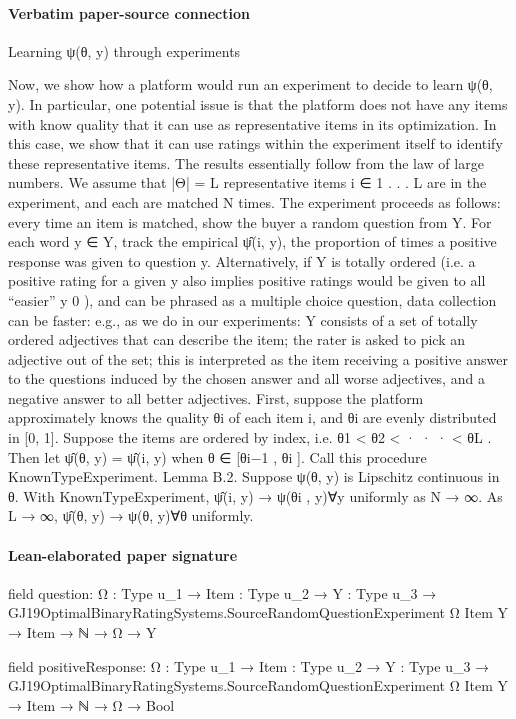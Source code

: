 \documentclass[10pt]{article}
\begin{document}
\paragraph{Verbatim paper-source connection}
\begin{ReviewVerbatim}
Learning ψ(θ, y) through experiments

Now, we show how a platform would run an experiment to decide to learn ψ(θ, y). In particular,
one potential issue is that the platform does not have any items with know quality that it can use
as representative items in its optimization. In this case, we show that it can use ratings within the
experiment itself to identify these representative items. The results essentially follow from the law
of large numbers.
We assume that |Θ| = L representative items i ∈ {1 . . . L} are in the experiment, and each are
matched N times. The experiment proceeds as follows: every time an item is matched, show the
buyer a random question from Y. For each word y ∈ Y, track the empirical ψ̂(i, y), the proportion
of times a positive response was given to question y. Alternatively, if Y is totally ordered (i.e. a
positive rating for a given y also implies positive ratings would be given to all “easier” y 0 ), and
can be phrased as a multiple choice question, data collection can be faster: e.g., as we do in our
experiments: Y consists of a set of totally ordered adjectives that can describe the item; the rater is
asked to pick an adjective out of the set; this is interpreted as the item receiving a positive answer
to the questions induced by the chosen answer and all worse adjectives, and a negative answer to
all better adjectives.
First, suppose the platform approximately knows the quality θi of each item i, and θi are evenly
distributed in [0, 1]. Suppose the items are ordered by index, i.e. θ1 < θ2 < · · · < θL . Then let
ψ̂(θ, y) = ψ̂(i, y) when θ ∈ [θi−1 , θi ]. Call this procedure KnownTypeExperiment.
Lemma B.2. Suppose ψ(θ, y) is Lipschitz continuous in θ. With KnownTypeExperiment, ψ̂(i, y) →
ψ(θi , y)∀y uniformly as N → ∞. As L → ∞, ψ̂(θ, y) → ψ(θ, y)∀θ uniformly.
\end{ReviewVerbatim}



\paragraph{Lean-elaborated paper signature}
\begin{ReviewVerbatim}
field question:
{Ω : Type u_1} →
  {Item : Type u_2} →
    {Y : Type u_3} → GJ19OptimalBinaryRatingSystems.SourceRandomQuestionExperiment Ω Item Y → Item → ℕ → Ω → Y

field positiveResponse:
{Ω : Type u_1} →
  {Item : Type u_2} →
    {Y : Type u_3} → GJ19OptimalBinaryRatingSystems.SourceRandomQuestionExperiment Ω Item Y → Item → ℕ → Ω → Bool
\end{ReviewVerbatim}
\end{document}
